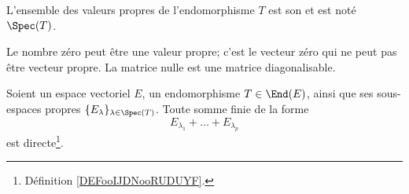 \begin{definition}
	L'ensemble des valeurs propres de l'endomorphisme \( T\) est son  et est noté \( \Spec(T)\).
\end{definition}

\begin{remark}
	Le nombre zéro peut être une valeur propre; c'est le vecteur zéro qui ne peut pas être vecteur propre. La matrice nulle est une matrice diagonalisable.
\end{remark}

\begin{lemma}       \label{LemjcztYH}
	Soient un espace vectoriel \( E\), un endomorphisme \( T\in \End(E)\), ainsi que ses sous-espaces propres \( \{ E_{\lambda} \}_{\lambda\in \Spec(T)}  \). Toute somme finie de la forme
	\begin{equation}
		E_{\lambda_1}+\ldots+E_{\lambda_p}
	\end{equation}
	est directe\footnote{Définition \ref{DEFooIJDNooRUDUYF}.}.
\end{lemma}

